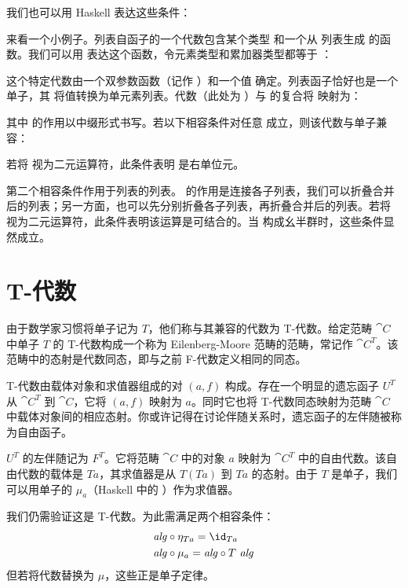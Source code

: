 \noindent
我们也可以用 Haskell 表达这些条件：

来看一个小例子。列表自函子的一个代数包含某个类型  和一个从  列表生成  的函数。我们可以用  表达这个函数，令元素类型和累加器类型都等于 ：

这个特定代数由一个双参数函数（记作 ）和一个值  确定。列表函子恰好也是一个单子，其  将值转换为单元素列表。代数（此处为 ）与  的复合将  映射为：

其中  的作用以中缀形式书写。若以下相容条件对任意  成立，则该代数与单子兼容：

若将  视为二元运算符，此条件表明  是右单位元。

第二个相容条件作用于列表的列表。 的作用是连接各子列表，我们可以折叠合并后的列表；另一方面，也可以先分别折叠各子列表，再折叠合并后的列表。若将  视为二元运算符，此条件表明该运算是可结合的。当  构成幺半群时，这些条件显然成立。

\section{T-代数}

由于数学家习惯将单子记为 $T$，他们称与其兼容的代数为 T-代数。给定范畴 $\cat{C}$ 中单子 $T$ 的 T-代数构成一个称为 Eilenberg-Moore 范畴的范畴，常记作 $\cat{C}^T$。该范畴中的态射是代数同态，即与之前 F-代数定义相同的同态。

T-代数由载体对象和求值器组成的对 $(a, f)$ 构成。存在一个明显的遗忘函子 $U^T$ 从 $\cat{C}^T$ 到 $\cat{C}$，它将 $(a, f)$ 映射为 $a$。同时它也将 T-代数同态映射为范畴 $\cat{C}$ 中载体对象间的相应态射。你或许记得在讨论伴随关系时，遗忘函子的左伴随被称为自由函子。

$U^T$ 的左伴随记为 $F^T$。它将范畴 $\cat{C}$ 中的对象 $a$ 映射为 $\cat{C}^T$ 中的自由代数。该自由代数的载体是 $T a$，其求值器是从 $T (T a)$ 到 $T a$ 的态射。由于 $T$ 是单子，我们可以用单子的 $\mu_a$（Haskell 中的 ）作为求值器。

我们仍需验证这是 T-代数。为此需满足两个相容条件：
\begin{align*}
  \mathit{alg} & \circ \eta_{Ta} = \id_{Ta}     \\
  \mathit{alg} & \circ \mu_a = \mathit{alg} \circ T\ \mathit{alg}
\end{align*}
但若将代数替换为 $\mu$，这些正是单子定律。

